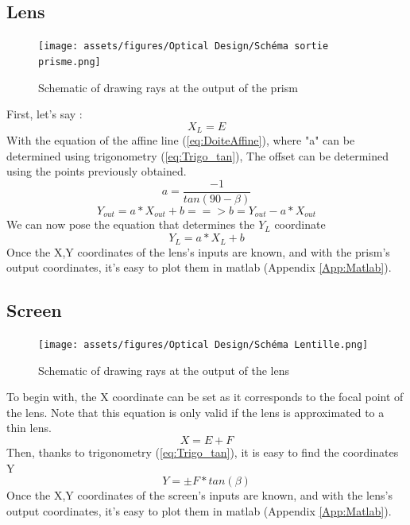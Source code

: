 \subsection{Lens}
\begin{figure}[H]
    \centering
    \texttt{[image: assets/figures/Optical Design/Schéma sortie prisme.png]}
    \caption{Schematic of drawing rays at the output of the prism}
    \label{fig:PrismLens_Schematic}
\end{figure}
First, let's say :
\begin{equation}
    X_L = E
\end{equation}
With the equation of the affine line (\ref{eq:DoiteAffine}),
where "a" can be determined using trigonometry (\ref{eq:Trigo_tan}),
The offset can be determined using the points previously obtained.
\begin{equation}
    a = \frac{-1}{tan(90-\beta)}
\end{equation}
\begin{equation}
    Y_{out} = a*X_{out} + b ==> b = Y_{out} - a*X_{out}
\end{equation}
We can now pose the equation that determines the $Y_L$ coordinate
\begin{equation}
    Y_{L} = a*X_{L} + b
\end{equation}
Once the X,Y coordinates of the lens's inputs are known, and with the prism's output coordinates, it's easy to plot them in matlab (Appendix \ref{App:Matlab}).
\subsection{Screen}
\begin{figure}[H]
    \centering
    \texttt{[image: assets/figures/Optical Design/Schéma Lentille.png]}
    \caption{Schematic of drawing rays at the output of the lens}
    \label{fig:Lens_Schematic}
\end{figure}
To begin with, the X coordinate can be set as it corresponds to the focal
point of the lens. Note that this equation is only valid if the lens is approximated to a thin lens.
\begin{equation}
    X = E+F
\end{equation}
Then, thanks to trigonometry (\ref{eq:Trigo_tan}), it is easy to find the coordinates Y
\begin{equation}
    Y = \pm F*tan(\beta)
\end{equation}
Once the X,Y coordinates of the screen's inputs are known, and with the lens's output coordinates, it's easy to plot them in matlab (Appendix \ref{App:Matlab}).
\newpage
